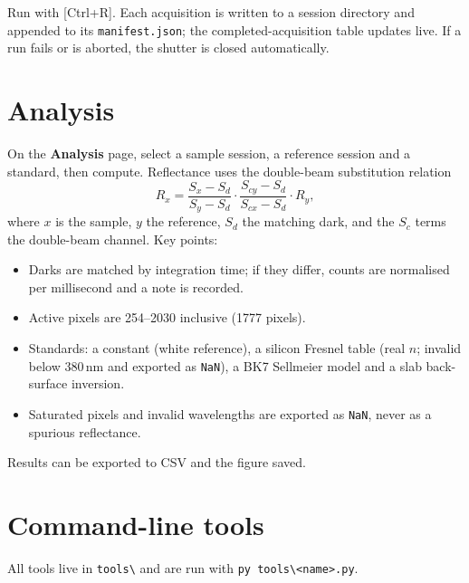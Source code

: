 \documentclass[11pt]{article}
\newcommand{\code}[1]{\texttt{\small #1}}
\newcommand{\key}[1]{\textsf{\small[#1]}}
\begin{document}
\noindent Run with \key{Ctrl+R}. Each acquisition is written to a session directory and appended to
its \code{manifest.json}; the completed-acquisition table updates live. If a run fails or is aborted,
the shutter is closed automatically.

\section{Analysis}

On the \textbf{Analysis} page, select a sample session, a reference session and a standard, then
compute. Reflectance uses the double-beam substitution relation
\[
R_x = \frac{S_x-S_d}{S_y-S_d}\cdot\frac{S_{cy}-S_d}{S_{cx}-S_d}\cdot R_y ,
\]
where $x$ is the sample, $y$ the reference, $S_d$ the matching dark, and the $S_c$ terms the
double-beam channel. Key points:
\begin{itemize}
\item Darks are matched by integration time; if they differ, counts are normalised per millisecond and
a note is recorded.
\item Active pixels are 254--2030 inclusive (1777 pixels).
\item Standards: a constant (white reference), a silicon Fresnel table (real $n$; invalid below
380\,nm and exported as \code{NaN}), a BK7 Sellmeier model and a slab back-surface inversion.
\item Saturated pixels and invalid wavelengths are exported as \code{NaN}, never as a spurious
reflectance.
\end{itemize}
Results can be exported to CSV and the figure saved.

\section{Command-line tools}

All tools live in \code{tools\textbackslash} and are run with \code{py tools\textbackslash <name>.py}.
\end{document}
